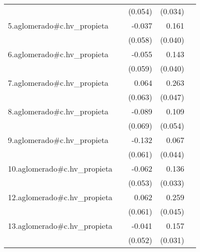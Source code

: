 {\begin{longtable}{l*{4}{D{.}{.}{-1}}}
            &                     &     (0.054)         &     (0.034)         &                     \\
\addlinespace
5.aglomerado#c.hv\_propieta&                     &      -0.037         &       0.161\sym{***}&                     \\
            &                     &     (0.058)         &     (0.040)         &                     \\
\addlinespace
6.aglomerado#c.hv\_propieta&                     &      -0.055         &       0.143\sym{***}&                     \\
            &                     &     (0.059)         &     (0.040)         &                     \\
\addlinespace
7.aglomerado#c.hv\_propieta&                     &       0.064         &       0.263\sym{***}&                     \\
            &                     &     (0.063)         &     (0.047)         &                     \\
\addlinespace
8.aglomerado#c.hv\_propieta&                     &      -0.089         &       0.109\sym{*}  &                     \\
            &                     &     (0.069)         &     (0.054)         &                     \\
\addlinespace
9.aglomerado#c.hv\_propieta&                     &      -0.132\sym{*}  &       0.067         &                     \\
            &                     &     (0.061)         &     (0.044)         &                     \\
\addlinespace
10.aglomerado#c.hv\_propieta&                     &      -0.062         &       0.136\sym{***}&                     \\
            &                     &     (0.053)         &     (0.033)         &                     \\
\addlinespace
12.aglomerado#c.hv\_propieta&                     &       0.062         &       0.259\sym{***}&                     \\
            &                     &     (0.061)         &     (0.045)         &                     \\
\addlinespace
13.aglomerado#c.hv\_propieta&                     &      -0.041         &       0.157\sym{***}&                     \\
            &                     &     (0.052)         &     (0.031)         &                     \\

\end{longtable}}
